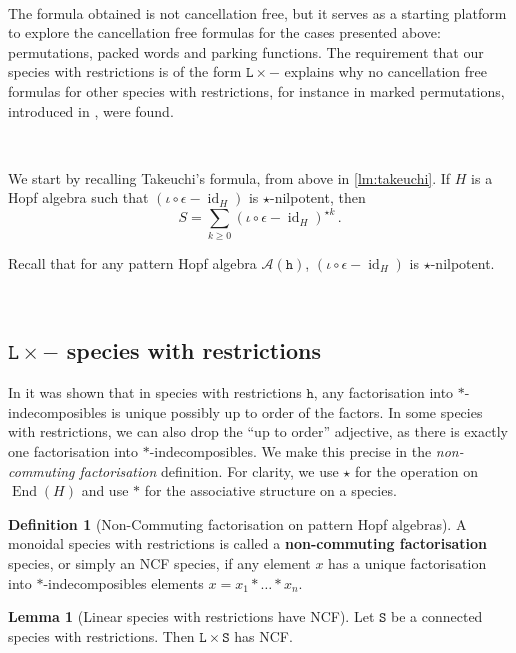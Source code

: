 \documentclass[12pt, reqno]{amsart}
\theoremstyle{definition}
\newtheorem{lm}[thm]{Lemma}
\newtheorem{defin}[thm]{Definition}
\DeclareMathOperator{\id}{id}
\DeclareMathOperator{\End}{\mathrm{End}}
\begin{document}
\

The formula obtained is not cancellation free, but it serves as a starting platform to explore the cancellation free formulas for the cases presented above: permutations, packed words and parking functions. The requirement that our species with restrictions is of the form $\mathtt{L} \times -$ explains why no cancellation free formulas for other species with restrictions, for instance in marked permutations, introduced in \cite{Penaguiao2020}, were found.

\

We start by recalling Takeuchi's formula, from above in \cref{lm:takeuchi}.
If $H$ is a Hopf algebra such that $(  \iota  \circ\epsilon - \id_H)$ is $\star$-nilpotent, then 
$$S = \sum_{k\geq 0 }  ( \iota  \circ\epsilon- \id_H)^{\star k}\, . $$

Recall that for any pattern Hopf algebra $\mathcal A (\mathtt{h})$, $(\iota\circ \epsilon - \id_H)$ is $\star$-nilpotent. 

\

\subsection{$\mathtt{L}\times -$ species with restrictions}


In \cite[Corollary 4.4.]{Penaguiao2020} it was shown that in species with restrictions $\mathtt{h}$, any factorisation into $\ast$-indecomposibles is unique possibly up to order of the factors.
In some species with restrictions, we can also drop the ``up to order'' adjective, as there is exactly one factorisation into $\ast$-indecomposibles. We make this precise in the \textit{non-commuting factorisation} definition.
For clarity, we use $\star$ for the operation on $\End (H)$ and use $\ast $ for the associative structure on a species.



\begin{defin}[Non-Commuting factorisation on pattern Hopf algebras]\label{defin:ncf}
A monoidal species with restrictions is called a \textbf{non-commuting factorisation} species, or simply an NCF species, if any element $x$ has a unique factorisation into $\ast$-indecomposibles elements $x = x_1 \ast \dots \ast x_n$.
\end{defin}


\begin{lm}[Linear species with restrictions have NCF]
Let $\mathtt{S}$ be a connected species with restrictions.
Then $\mathtt{L} \times \mathtt{S}$ has NCF.
\end{lm}
\end{document}
